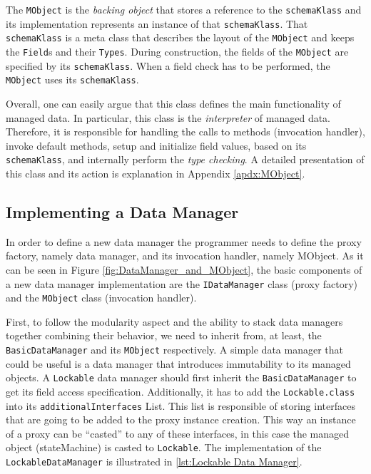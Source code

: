 The \texttt{MObject} is the \textit{backing object} that stores a reference to the \texttt{schemaKlass} and its implementation represents an instance of that \texttt{schemaKlass}.
That \texttt{schemaKlass} is a meta class that describes the layout of the \texttt{MObject} and keeps the \texttt{Field}s and their \texttt{Types}.
During construction, the fields of the \texttt{MObject} are specified by its \texttt{schemaKlass}.
When a field check has to be performed, the \texttt{MObject} uses its \texttt{schemaKlass}.

Overall, one can easily argue that this class defines the main functionality of managed data.
In particular, this class is the \textit{interpreter} of managed data.
Therefore, it is responsible for handling the calls to methods (invocation handler), invoke default methods, setup and initialize field values, based on its \texttt{schemaKlass}, and internally perform the \textit{type checking}.
A detailed presentation of this class and its action is explanation in Appendix \ref{apdx:MObject}.

\subsection{Implementing a Data Manager}\label{Implementing a Data Manager}
In order to define a new data manager the programmer needs to define the proxy factory, namely data manager, and its invocation handler, namely MObject.
As it can be seen in Figure \ref{fig:DataManager_and_MObject}, the basic components of a new data manager implementation are the \texttt{IDataManager} class (proxy factory) and the \texttt{MObject} class (invocation handler).

First, to follow the modularity aspect and the ability to stack data managers together combining their behavior, we need to inherit from, at least, the \texttt{BasicDataManager} and its \texttt{MObject} respectively.
A simple data manager that could be useful is a data manager that introduces immutability to its managed objects.
A \texttt{Lockable} data manager should first inherit the \texttt{BasicDataManager} to get its field access specification.
Additionally, it has to add the \texttt{Lockable.class} into its \texttt{additionalInterfaces} List.
This list is responsible of storing interfaces that are going to be added to the proxy instance creation.
This way an instance of a proxy can be ``casted'' to any of these interfaces, in this case the managed object (stateMachine) is casted to \texttt{Lockable}.
The implementation of the \texttt{LockableDataManager} is illustrated in \ref{lst:Lockable Data Manager}.

